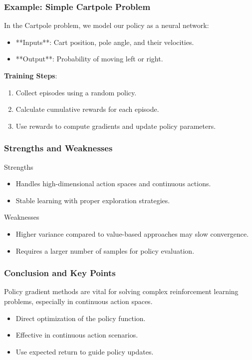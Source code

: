 \documentclass[aspectratio=169]{beamer}
\begin{document}
\begin{frame}[fragile]
  \frametitle{Example: Simple Cartpole Problem}
  In the Cartpole problem, we model our policy as a neural network:
  \begin{itemize}
    \item **Inputs**: Cart position, pole angle, and their velocities.
    \item **Output**: Probability of moving left or right.
  \end{itemize}
  
  \textbf{Training Steps}:
  \begin{enumerate}
    \item Collect episodes using a random policy.
    \item Calculate cumulative rewards for each episode.
    \item Use rewards to compute gradients and update policy parameters.
  \end{enumerate}
\end{frame}

\begin{frame}[fragile]
  \frametitle{Strengths and Weaknesses}
  \begin{block}{Strengths}
    \begin{itemize}
      \item Handles high-dimensional action spaces and continuous actions.
      \item Stable learning with proper exploration strategies.
    \end{itemize}
  \end{block}
  
  \begin{block}{Weaknesses}
    \begin{itemize}
      \item Higher variance compared to value-based approaches may slow convergence.
      \item Requires a larger number of samples for policy evaluation.
    \end{itemize}
  \end{block}
\end{frame}

\begin{frame}[fragile]
  \frametitle{Conclusion and Key Points}
  Policy gradient methods are vital for solving complex reinforcement learning problems, especially in continuous action spaces.
  
  \begin{itemize}
    \item Direct optimization of the policy function.
    \item Effective in continuous action scenarios.
    \item Use expected return to guide policy updates.
  \end{itemize}
\end{frame}
\end{document}
